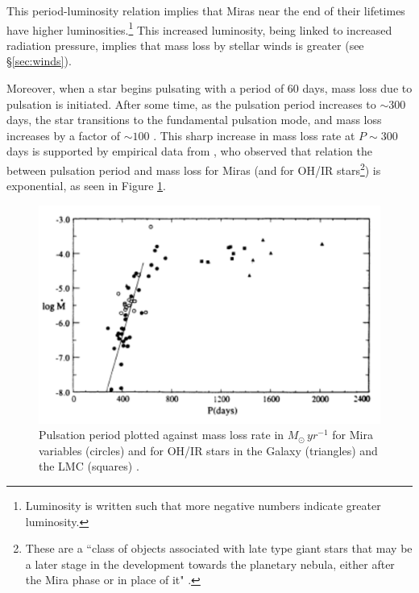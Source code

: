 \documentclass[twocolumn]{aastex63}
\begin{document}

This period-luminosity relation implies that Miras near the end of their lifetimes have higher luminosities.\footnote{Luminosity is written such that more negative numbers indicate greater luminosity.} This increased luminosity, being linked to increased radiation pressure, implies that mass loss by stellar winds is greater (see \S \ref{sec:winds}). 

Moreover, when a star begins pulsating with a period of 60 days, mass loss due to pulsation is initiated. After some time, as the pulsation period increases to $\sim 300$ days, the star transitions to the fundamental pulsation mode, and mass loss increases by a factor of $\sim 100$ \citep{mcdonald, bedijn}. This sharp increase in mass loss rate at $P\sim 300$ days is supported by empirical data from \cite{vassiliadis}, who observed that relation the between pulsation period and mass loss for Miras (and for OH/IR stars\footnote{These are a ``class of objects associated with late type giant stars that may be a later stage in the development towards the planetary nebula, either after the Mira phase or in place of it" \citep{pottasch}.}) is exponential, as seen in Figure \ref{fig:pulsation_massloss}.
\begin{figure}[!ht]
    \includegraphics[width=\textwidth]{pulsation_massloss.png}
    \caption{Pulsation period plotted against mass loss rate in $M_\odot\,yr^{-1}$ for Mira variables (circles) and for OH/IR stars in the Galaxy (triangles) and the LMC (squares) \citep{vassiliadis}.}
    \label{fig:pulsation_massloss}
\end{figure}
\end{document}
